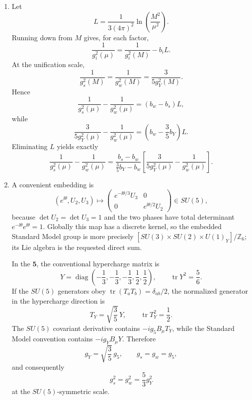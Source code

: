 \begin{enumerate}
\begin{enumerate}
    \item[(iv)] Let
    \[
      L=\frac{1}{3(4\pi)^2}\ln\left(\frac{M^2}{\mu^2}\right).
    \]
    Running down from \(M\) gives, for each factor,
    \[
      \frac{1}{g_i^2(\mu)}=\frac{1}{g_i^2(M)}-b_iL.
    \]
    At the unification scale,
    \[
      \frac{1}{g_s^2(M)}=\frac{1}{g_w^2(M)}
        =\frac{3}{5g_Y^2(M)}.
    \]
    Hence
    \[
      \frac{1}{g_s^2(\mu)}-\frac{1}{g_w^2(\mu)}
        =(b_w-b_s)L,
    \]
    while
    \[
      \frac{3}{5g_Y^2(\mu)}-\frac{1}{g_w^2(\mu)}
        =\left(b_w-\frac35b_Y\right)L.
    \]
    Eliminating \(L\) yields exactly
    \[
      \boxed{
      \frac{1}{g_s^2(\mu)}-\frac{1}{g_w^2(\mu)}
      =\frac{b_s-b_w}{\tfrac35b_Y-b_w}\left[
        \frac{3}{5g_Y^2(\mu)}-\frac{1}{g_w^2(\mu)}
      \right].}
    \]

    \item[(v)] A convenient embedding is
    \[
      (e^{\ii\theta},U_2,U_3)\longmapsto
      \begin{pmatrix}
        e^{-\ii\theta/3}U_3&0\\
        0&e^{\ii\theta/2}U_2
      \end{pmatrix}\in SU(5),
    \]
    because \(\det U_2=\det U_3=1\) and the two phases have total
    determinant \(e^{-\ii\theta}e^{\ii\theta}=1\).  Globally this map has a
    discrete kernel, so the embedded Standard Model group is more precisely
    \([SU(3)\times SU(2)\times U(1)_Y]/\mathbb Z_6\); its Lie algebra is the
    requested direct sum.

    In the \(\mathbf5\), the conventional hypercharge matrix is
    \[
      Y=\operatorname{diag}\left(
        -\frac13,-\frac13,-\frac13,\frac12,\frac12
      \right),
      \qquad \operatorname{tr}Y^2=\frac56.
    \]
    If the \(SU(5)\) generators obey
    \(\operatorname{tr}(T_aT_b)=\delta_{ab}/2\), the normalized generator
    in the hypercharge direction is
    \[
      T_Y=\sqrt{\frac35}\,Y,
      \qquad \operatorname{tr}T_Y^2=\frac12.
    \]
    The \(SU(5)\) covariant derivative contains
    \(-ig_5B_\mu T_Y\), while the Standard Model convention contains
    \(-ig_YB_\mu Y\).  Therefore
    \[
      g_Y=\sqrt{\frac35}\,g_5,
      \qquad
      g_s=g_w=g_5,
    \]
    and consequently
    \[
      \boxed{g_s^2=g_w^2=\frac53g_Y^2}
    \]
    at the \(SU(5)\)-symmetric scale.
  \end{enumerate}


\end{enumerate}
